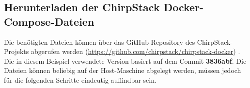 	
	
	

	
\subsection{Herunterladen der ChirpStack Docker-Compose-Dateien}

Die benötigten Dateien können über das GitHub-Repository  des ChirpStack-Projekts abgerufen werden (\url{https://github.com/chirpstack/chirpstack-docker}) \cite{ChirpstackGIT:2018}. 
Die in diesem Beispiel verwendete Version basiert auf dem Commit \textbf{3836abf}. 
Die Dateien können beliebig auf der Host-Maschine abgelegt werden, müssen jedoch für die folgenden Schritte eindeutig auffindbar sein.


